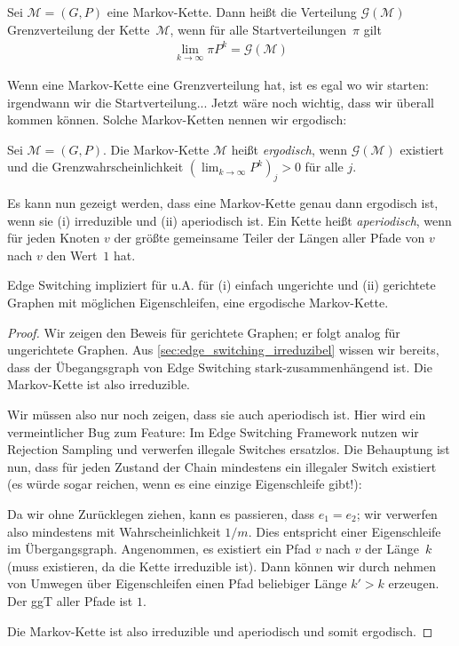 \begin{definition}
    Sei $\mathcal M = (G, P)$ eine Markov-Kette.
    Dann heißt die Verteilung $\mathcal G(\mathcal M)$ Grenzverteilung der Kette~$\mathcal M$, wenn für alle Startverteilungen~$\pi$ gilt
    \begin{align}
        \lim_{k \to \infty} \pi P^k = \mathcal G(\mathcal M)
    \end{align}
\end{definition}

Wenn eine Markov-Kette eine Grenzverteilung hat, ist es egal wo wir starten:
irgendwann  wir die Startverteilung...
Jetzt wäre noch wichtig, dass wir überall  kommen können.
Solche Markov-Ketten nennen wir ergodisch:

\begin{definition}
    Sei $\mathcal M = (G, P)$. Die Markov-Kette $\mathcal M$ heißt \emph{ergodisch}, wenn $\mathcal G(\mathcal M)$ existiert und die Grenzwahrscheinlichkeit $(\lim_{k \to \infty} P^k)_j > 0$ für alle $j$.
\end{definition}

Es kann nun gezeigt werden, dass eine Markov-Kette genau dann ergodisch ist, wenn sie (i) irreduzible und (ii) aperiodisch ist.
Ein Kette heißt \emph{aperiodisch}, wenn für jeden Knoten $v$ der größte gemeinsame Teiler der Längen aller Pfade von $v$ nach $v$ den Wert~$1$ hat.

\begin{theorem}
    Edge Switching impliziert für u.A. für (i) einfach ungerichte und (ii) gerichtete Graphen mit möglichen Eigenschleifen, eine ergodische Markov-Kette.
\end{theorem}

\begin{proof}
    Wir zeigen den Beweis für gerichtete Graphen; er folgt analog für ungerichtete Graphen.
    Aus \cref{sec:edge_switching_irreduzibel} wissen wir bereits, dass der Übegangsgraph von Edge Switching stark-zusammenhängend ist.
    Die Markov-Kette ist also irreduzible.

    Wir müssen also nur noch zeigen, dass sie auch aperiodisch ist.
    Hier wird ein vermeintlicher Bug zum Feature:
    Im Edge Switching Framework nutzen wir Rejection Sampling und verwerfen illegale Switches ersatzlos.
    Die Behauptung ist nun, dass für jeden Zustand der Chain mindestens ein illegaler Switch existiert (es würde sogar reichen, wenn es eine einzige Eigenschleife gibt!):

    Da wir ohne Zurücklegen ziehen, kann es passieren, dass $e_1 = e_2$; wir verwerfen also mindestens mit Wahrscheinlichkeit $1 / m$.
    Dies entspricht einer Eigenschleife im Übergangsgraph.
    Angenommen, es existiert ein Pfad $v$ nach $v$ der Länge~$k$ (muss existieren, da die Kette irreduzible ist).
    Dann können wir durch nehmen von Umwegen über Eigenschleifen einen Pfad beliebiger Länge $k' > k$ erzeugen.
    Der ggT aller Pfade ist $1$.

    Die Markov-Kette ist also irreduzible und aperiodisch und somit ergodisch.
\end{proof}

